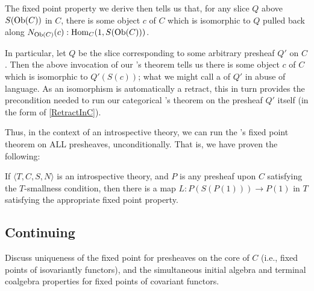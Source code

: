 The fixed point property we derive then tells us that, for any slice $Q$ above $S(\operatorname{Ob}(C))$ in $C$, there is some object $c$ of $C$ which is isomorphic to $Q$ pulled back along $N_{\operatorname{Ob}(C)}(c) : \operatorname{Hom}_C(1, S(\operatorname{Ob}(C)))$.

In particular, let $Q$ be the slice corresponding to some arbitrary presheaf $Q'$ on $C$. Then the above invocation of our \Loeb's theorem tells us there is some object $c$ of $C$ which is isomorphic to $Q'(S(c))$; what we might call a  of $Q'$ in abuse of language. As an isomorphism is automatically a retract, this in turn provides the precondition needed to run our categorical \Loeb's theorem on the presheaf $Q'$ itself (in the form of \cref{RetractInC}).

Thus, in the context of an introspective theory, we can run the \Loeb's fixed point theorem on ALL presheaves, unconditionally. That is, we have proven the following:

\begin{corollary}\label{LoebInIntrosp}
If $\langle T, C, S, N \rangle$ is an introspective theory, and $P$ is any presheaf upon $C$ satisfying the $T$-smallness condition, then there is a map $L : P(S(P(1))) \to P(1)$ in $T$ satisfying the appropriate fixed point property.
\end{corollary}

\subsection{Continuing}

\begin{TODOblock}
Discuss uniqueness of the fixed point for presheaves on the core of $C$ (i.e., fixed points of isovariantly functors), and the simultaneous initial algebra and terminal coalgebra properties for fixed points of covariant functors.
\end{TODOblock}